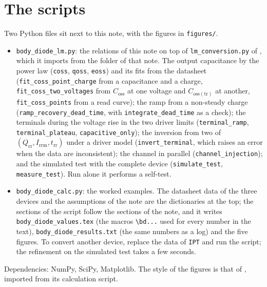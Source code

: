 \documentclass[10pt,a4paper]{scrartcl}
\newcommand{\Irrm}{I_\mathrm{rrm}}
\newcommand{\Qrr}{Q_\mathrm{rr}}
\newcommand{\Coss}{C_\mathrm{oss}}
\newcommand{\trr}{t_\mathrm{rr}}
\begin{document}
\section{The scripts}
\label{app:scripts}
Two Python files sit next to this note, with the figures in \texttt{figures/}.
\begin{itemize}
\item \texttt{body\_diode\_lm.py}: the relations of this note on top of \texttt{lm\_conversion.py} of \cite{lmnote}, which it imports from the folder of that note. The output capacitance by the power law (\texttt{coss}, \texttt{qoss}, \texttt{eoss}) and its fits from the datasheet (\texttt{fit\_coss\_point\_charge} from a capacitance and a charge, \texttt{fit\_coss\_two\_voltages} from $\Coss$ at one voltage and $C_\mathrm{oss(tr)}$ at another, \texttt{fit\_coss\_points} from a read curve); the ramp from a non-steady charge (\texttt{ramp\_recovery\_dead\_time}, with \texttt{integrate\_dead\_time} as a check); the terminals during the voltage rise in the two driver limits (\texttt{terminal\_ramp}, \texttt{terminal\_plateau}, \texttt{capacitive\_only}); the inversion from two of $(\Qrr, \Irrm, \trr)$ under a driver model (\texttt{invert\_terminal}, which raises an error when the data are inconsistent); the channel in parallel (\texttt{channel\_injection}); and the simulated test with the complete device (\texttt{simulate\_test}, \texttt{measure\_test}). Run alone it performs a self-test.
\item \texttt{body\_diode\_calc.py}: the worked examples. The datasheet data of the three devices and the assumptions of the note are the dictionaries at the top; the sections of the script follow the sections of the note, and it writes \texttt{body\_diode\_values.tex} (the macros \verb|\bd...| used for every number in the text), \texttt{body\_diode\_results.txt} (the same numbers as a log) and the five figures. To convert another device, replace the data of \texttt{IPT} and run the script; the refinement on the simulated test takes a few seconds.
\end{itemize}
Dependencies: NumPy, SciPy, Matplotlib. The style of the figures is that of \cite{lmnote}, imported from its calculation script.
\end{document}
